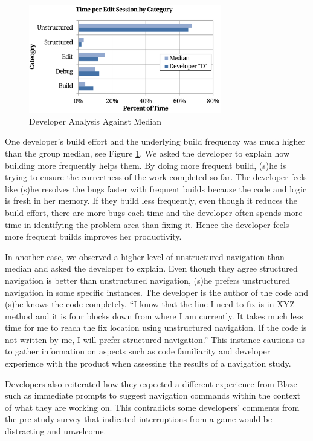 \documentclass{sig-alternate}
\begin{document}
\begin{figure}
	\includegraphics[width=3.3in]{developerEmedian.pdf}
	\caption{Developer Analysis Against Median}
	\label{fig:developercomparison}
\end{figure}


One developer's build effort and the underlying build frequency was much higher than the group median, see Figure \ref{fig:developercomparison}.  We asked the developer to explain how building more frequently helps them. By doing more frequent build, (s)he is trying to ensure the correctness of the work completed so far. The developer feels like (s)he resolves the bugs faster with frequent builds because the code and logic is fresh in her memory. If they build less frequently, even though it reduces the build effort, there are more bugs each time and the developer often spends more time in identifying the problem area than fixing it. Hence the developer feels more frequent builds improves her productivity.  

In another case, we observed a higher level of unstructured navigation than median and asked the developer to explain.  Even though they agree  structured navigation is better than unstructured navigation, (s)he prefers unstructured navigation in some specific instances. The developer is the author of the code and (s)he knows the code completely. ``I know that the line I need to fix is in XYZ method and it is four blocks down from where I am currently. It takes much less time for me to reach the fix location using unstructured navigation. If the code is not written by me, I will prefer structured navigation.'' This instance cautions us to gather information on aspects such as code familiarity and developer experience with the product when assessing the results of a navigation study.

Developers also reiterated how they expected a different experience from Blaze  such as immediate prompts to suggest navigation commands within the context of what they are working on.  This contradicts some developers' comments from the pre-study survey that indicated interruptions from a game would be distracting and unwelcome.
\end{document}
